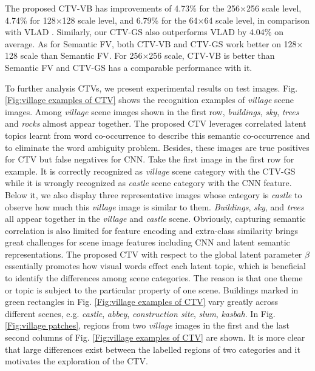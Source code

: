 \documentclass[journal]{IEEEtran}
\begin{document}
The proposed CTV-VB has improvements of 4.73\% for the 256$\times$256 scale level, 4.74\% for 128$\times$128 scale level, and 6.79\% for the 64$\times$64 scale level, in comparison with VLAD \cite{gong2014multi}. Similarly, our CTV-GS also outperforms VLAD by 4.04\% on average. As for Semantic FV, both CTV-VB and CTV-GS work better on 128$\times$128 scale than Semantic FV. For 256$\times$256 scale, CTV-VB is better than Semantic FV and CTV-GS has a comparable performance with it.

To further analysis CTVs, we present experimental results on test images. Fig. \ref{Fig:village examples of CTV} shows the recognition examples of \emph{village} scene images. Among \emph{village} scene images shown in the first row, \emph{buildings}, \emph{sky}, \emph{trees} and \emph{rocks} almost appear together. The proposed CTV leverages correlated latent topics learnt from word co-occurrence to describe this semantic co-occurrence and to eliminate the word ambiguity problem. Besides, these images are true positives for CTV but false negatives for CNN. Take the first image in the first row for example. It is correctly recognized as \emph{village} scene category with the CTV-GS while it is wrongly recognized as \emph{castle} scene category with the CNN feature. Below it, we also display three representative images whose category is \emph{castle} to observe how much this \emph{village} image is similar to them. \emph{Buildings}, \emph{sky}, and \emph{trees} all appear together in the \emph{village} and \emph{castle} scene. Obviously, capturing semantic correlation is also limited for feature encoding and extra-class similarity brings great challenges for scene image features including CNN and latent semantic representations. The proposed CTV with respect to the global latent parameter $\beta$ essentially promotes how visual words effect each latent topic, which is beneficial to identify the differences among scene categories. The reason is that one theme or topic is subject to the particular property of one scene. Buildings marked in green rectangles in Fig. \ref{Fig:village examples of CTV} vary greatly across different scenes, e.g. \emph{castle}, \emph{abbey}, \emph{construction site}, \emph{slum}, \emph{kasbah}. In Fig. \ref{Fig:village patches}, regions from two \emph{village} images in the first and the last second columns of Fig. \ref{Fig:village examples of CTV} are shown. It is more clear that large differences exist between the labelled regions of two categories and it motivates the exploration of the CTV.
\end{document}
